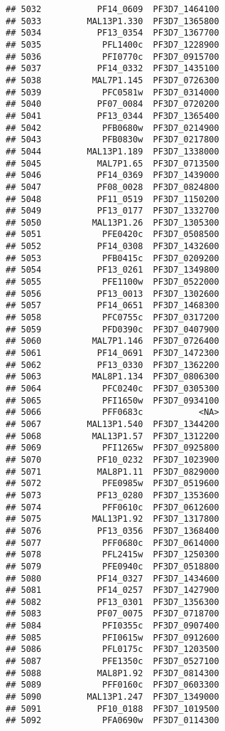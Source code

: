 \documentclass[12pt, a4paper]{article}\usepackage[]{graphicx}\usepackage[]{color}
\makeatletter
\newenvironment{kframe}{%
 \def\at@end@of@kframe{}%
 \ifinner\ifhmode%
  \def\at@end@of@kframe{\end{minipage}}%
  \begin{minipage}{\columnwidth}%
 \fi\fi%
 \def\FrameCommand##1{\hskip\@totalleftmargin \hskip-\fboxsep
 \colorbox{shadecolor}{##1}\hskip-\fboxsep
     \hskip-\linewidth \hskip-\@totalleftmargin \hskip\columnwidth}%
 \MakeFramed {\advance\hsize-\width
   \@totalleftmargin\z@ \linewidth\hsize
   \@setminipage}}%
 {\par\unskip\endMakeFramed%
 \at@end@of@kframe}
\newenvironment{knitrout}{}{} %
\makeatother
\begin{document}
\begin{knitrout}
\begin{kframe}
\begin{verbatim}
## 5032           PF14_0609  PF3D7_1464100
## 5033         MAL13P1.330  PF3D7_1365800
## 5034           PF13_0354  PF3D7_1367700
## 5035            PFL1400c  PF3D7_1228900
## 5036            PFI0770c  PF3D7_0915700
## 5037           PF14_0332  PF3D7_1435100
## 5038          MAL7P1.145  PF3D7_0726300
## 5039            PFC0581w  PF3D7_0314000
## 5040           PF07_0084  PF3D7_0720200
## 5041           PF13_0344  PF3D7_1365400
## 5042            PFB0680w  PF3D7_0214900
## 5043            PFB0830w  PF3D7_0217800
## 5044         MAL13P1.189  PF3D7_1338000
## 5045           MAL7P1.65  PF3D7_0713500
## 5046           PF14_0369  PF3D7_1439000
## 5047           PF08_0028  PF3D7_0824800
## 5048           PF11_0519  PF3D7_1150200
## 5049           PF13_0177  PF3D7_1332700
## 5050          MAL13P1.26  PF3D7_1305300
## 5051            PFE0420c  PF3D7_0508500
## 5052           PF14_0308  PF3D7_1432600
## 5053            PFB0415c  PF3D7_0209200
## 5054           PF13_0261  PF3D7_1349800
## 5055            PFE1100w  PF3D7_0522000
## 5056           PF13_0013  PF3D7_1302600
## 5057           PF14_0651  PF3D7_1468300
## 5058            PFC0755c  PF3D7_0317200
## 5059            PFD0390c  PF3D7_0407900
## 5060          MAL7P1.146  PF3D7_0726400
## 5061           PF14_0691  PF3D7_1472300
## 5062           PF13_0330  PF3D7_1362200
## 5063          MAL8P1.134  PF3D7_0806300
## 5064            PFC0240c  PF3D7_0305300
## 5065            PFI1650w  PF3D7_0934100
## 5066            PFF0683c           <NA>
## 5067         MAL13P1.540  PF3D7_1344200
## 5068          MAL13P1.57  PF3D7_1312200
## 5069            PFI1265w  PF3D7_0925800
## 5070           PF10_0232  PF3D7_1023900
## 5071           MAL8P1.11  PF3D7_0829000
## 5072            PFE0985w  PF3D7_0519600
## 5073           PF13_0280  PF3D7_1353600
## 5074            PFF0610c  PF3D7_0612600
## 5075          MAL13P1.92  PF3D7_1317800
## 5076           PF13_0356  PF3D7_1368400
## 5077            PFF0680c  PF3D7_0614000
## 5078            PFL2415w  PF3D7_1250300
## 5079            PFE0940c  PF3D7_0518800
## 5080           PF14_0327  PF3D7_1434600
## 5081           PF14_0257  PF3D7_1427900
## 5082           PF13_0301  PF3D7_1356300
## 5083           PF07_0075  PF3D7_0718700
## 5084            PFI0355c  PF3D7_0907400
## 5085            PFI0615w  PF3D7_0912600
## 5086            PFL0175c  PF3D7_1203500
## 5087            PFE1350c  PF3D7_0527100
## 5088           MAL8P1.92  PF3D7_0814300
## 5089            PFF0160c  PF3D7_0603300
## 5090         MAL13P1.247  PF3D7_1349000
## 5091           PF10_0188  PF3D7_1019500
## 5092            PFA0690w  PF3D7_0114300

\end{verbatim}
\end{kframe}
\end{knitrout}
\end{document}
